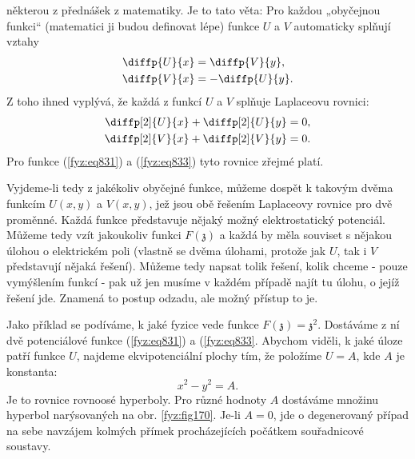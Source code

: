   některou z přednášek z matematiky. Je to tato věta: Pro každou „obyčejnou funkci“ (matematici ji
  budou definovat lépe) funkce \(U\) a \(V\) automaticky splňují vztahy
  \begin{subequations}\label{fyz:eq834}
    \begin{align}
      \diffp{U}{x} &=  \diffp{V}{y},       \label{fyz:eq834a}     \\
      \diffp{V}{x} &= -\diffp{U}{y}.       \label{fyz:eq834b}     
    \end{align}
  \end{subequations}
  Z toho ihned vyplývá, že každá z funkcí \(U\) a \(V\) splňuje Laplaceovu rovnici:
  \begin{subequations}\label{fyz:eq835}
    \begin{align}
      \diffp[2]{U}{x} + \diffp[2]{U}{y} &=0,       \label{fyz:eq835a}     \\
      \diffp[2]{V}{x} + \diffp[2]{V}{y} &=0.       \label{fyz:eq835b}     
    \end{align}
  \end{subequations}
  Pro funkce (\ref{fyz:eq831}) a (\ref{fyz:eq833}) tyto rovnice zřejmé platí.

  Vyjdeme-li tedy z jakékoliv obyčejné funkce, můžeme dospět k takovým dvěma funkcím \(U(x, y)\) a
  \(V(x, y)\), jež jsou obě řešením Laplaceovy rovnice pro dvě proměnné. Každá funkce představuje
  nějaký možný elektrostatický potenciál. Můžeme tedy vzít jakoukoliv funkci \(F(\mathfrak{z})\) a
  každá by měla souviset s nějakou úlohou o elektrickém poli (vlastně se dvěma úlohami, protože jak
  \(U\), tak i \(V\) představují nějaká řešení). Můžeme tedy napsat tolik řešení, kolik chceme -
  pouze vymýšlením funkcí - pak už jen musíme v každém případě najít tu úlohu, o jejíž řešení jde.
  Znamená to postup odzadu, ale možný přístup to je.

  Jako příklad se podíváme, k jaké fyzice vede funkce \(F(\mathfrak{z}) = \mathfrak{z}^2 \).
  Dostáváme z ní dvě potenciálové funkce (\ref{fyz:eq831}) a (\ref{fyz:eq833}. Abychom viděli, k
  jaké úloze patří funkce \(U\), najdeme ekvipotenciální plochy tím, že položíme \(U=A\), kde \(A\)
  je konstanta:
  \begin{equation*}
    x^2 - y^2 = A.
  \end{equation*}
  Je to rovnice rovnoosé hyperboly. Pro různé hodnoty \(A\) dostáváme množinu hyperbol narýsovaných
  na obr. \ref{fyz:fig170}. Je-li \(A = 0\), jde o degenerovaný případ na sebe navzájem kolmých
  přímek procházejících počátkem souřadnicové soustavy.

